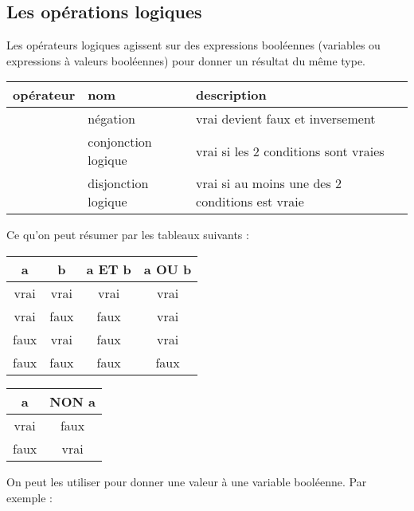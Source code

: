 		\subsection{Les opérations logiques}
	
			Les opérateurs logiques agissent sur des expressions booléennes 
			(variables ou expressions à valeurs booléennes) 
			pour donner un résultat du même type.
	
			\begin{center}
			\begin{tabular}{m{15mm}|m{3cm}|m{8cm}}
			opérateur & nom & description \\
			\hline
			\raggedleft \lda{NON} & négation & vrai devient faux et inversement\\
			\raggedleft \lda{ET} & conjonction logique & vrai si les 2 conditions sont vraies\\
			\raggedleft \lda{OU} & disjonction logique & vrai si au moins une des 2 conditions est vraie\\
			\hline
			\end{tabular}
			\end{center}
			\medskip
			
			Ce qu'on peut résumer par les tableaux suivants :
			
			\begin{center}
			\begin{tabular}{|cccc|}
				\hline
				a & b & a ET b & a OU b \\
				\hline
				vrai & vrai & vrai & vrai \\\hline
				vrai & faux & faux & vrai \\\hline
				faux & vrai & faux & vrai \\\hline
				faux & faux & faux & faux \\\hline				
			\end{tabular}
			\qquad
			\begin{tabular}{|cc|}
				\hline
				a & NON a \\
				\hline
				vrai & faux \\\hline
				faux & vrai \\\hline
			\end{tabular}
			\end{center}

			On peut les utiliser 
			pour donner une valeur à une variable booléenne.
			Par exemple :
			
